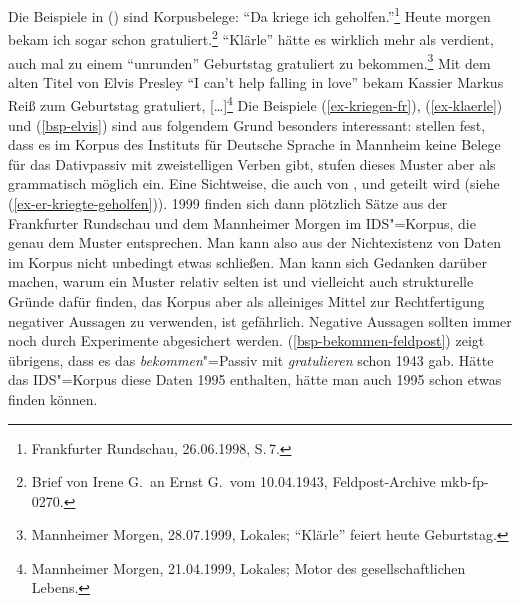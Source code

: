 \noindent
Die Beispiele in () sind Korpusbelege:
\eal
\ex\label{ex-kriegen-fr} "`Da kriege ich geholfen."'\footnote{
Frankfurter Rundschau, 26.06.1998, S.\,7.%
}
\ex\label{bsp-bekommen-feldpost}
Heute morgen bekam ich sogar schon gratuliert.\footnote{%
Brief von Irene G.\ an Ernst G.\ vom 10.04.1943, Feldpost-Archive mkb-fp-0270.}
\ex\label{ex-klaerle} 
"`Klärle"' hätte es wirklich mehr als verdient, auch mal zu einem "`unrunden"' Geburtstag gratuliert zu bekommen.\footnote{
Mannheimer Morgen, 28.07.1999, Lokales; "`Klärle"' feiert heute Geburtstag.%
}
\ex\label{bsp-elvis}
Mit dem alten Titel von Elvis Presley "`I can't help falling in love"' bekam Kassier Markus Reiß zum Geburtstag gratuliert, [\ldots]\footnote{
Mannheimer Morgen, 21.04.1999, Lokales; Motor des gesellschaftlichen Lebens.%
}
\zl
Die Beispiele (\ref{ex-kriegen-fr}), (\ref{ex-klaerle}) und (\ref{bsp-elvis}) 
sind aus folgendem Grund besonders interessant:\label{frequenz-von-korpusbelegen}
\citet[175]{HW95a} stellen fest, dass es im Korpus des Instituts für Deutsche Sprache in Mannheim keine
Belege für das Dativpassiv mit zweistelligen Verben gibt, stufen dieses Muster aber als grammatisch
möglich ein. Eine Sichtweise, die auch von \citeauthor{Wegener85a}, \citeauthor{Fanselow87a} und \citeauthor{Eisenberg94a} geteilt wird (siehe (\ref{ex-er-kriegte-geholfen})).
1999 finden sich dann plötzlich Sätze aus der Frankfurter Rundschau und dem Mannheimer Morgen im IDS"=Korpus, die genau dem Muster 
entsprechen. Man kann also aus der Nichtexistenz von Daten im Korpus nicht unbedingt etwas schließen. Man kann sich
Gedanken darüber machen, warum ein Muster relativ selten ist und vielleicht auch strukturelle
Gründe dafür finden, das Korpus aber als alleiniges Mittel zur Rechtfertigung negativer
Aussagen zu verwenden, ist gefährlich. Negative Aussagen sollten immer noch durch Experimente abgesichert
werden. (\ref{bsp-bekommen-feldpost}) zeigt übrigens, dass es das \emph{bekommen}"=Passiv mit \emph{gratulieren} 
schon 1943 gab. Hätte das IDS"=Korpus diese Daten 1995 enthalten, hätte man auch 1995 schon etwas finden können.

